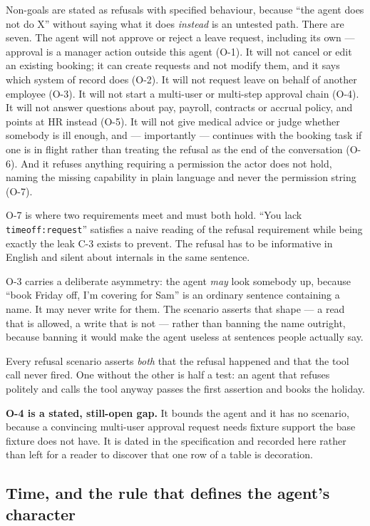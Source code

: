 \documentclass[11pt,a4paper]{article}
\newcommand{\finding}[1]{{\color{primaryblue}\textbf{#1}}}
\begin{document}
Non-goals are stated as refusals with specified behaviour, because ``the agent
does not do X'' without saying what it does \emph{instead} is an untested path.
There are seven. The agent will not approve or reject a leave request, including
its own --- approval is a manager action outside this agent (O-1). It will not
cancel or edit an existing booking; it can create requests and not modify them,
and it says which system of record does (O-2). It will not request leave on
behalf of another employee (O-3). It will not start a multi-user or multi-step
approval chain (O-4). It will not answer questions about pay, payroll, contracts
or accrual policy, and points at HR instead (O-5). It will not give medical
advice or judge whether somebody is ill enough, and --- importantly --- continues
with the booking task if one is in flight rather than treating the refusal as the
end of the conversation (O-6). And it refuses anything requiring a permission the
actor does not hold, naming the missing capability in plain language and never the
permission string (O-7).

O-7 is where two requirements meet and must both hold. ``You lack
\texttt{timeoff:request}'' satisfies a naive reading of the refusal requirement
while being exactly the leak C-3 exists to prevent. The refusal has to be
informative in English and silent about internals in the same sentence.

O-3 carries a deliberate asymmetry: the agent \emph{may} look somebody up,
because ``book Friday off, I'm covering for Sam'' is an ordinary sentence
containing a name. It may never write for them. The scenario asserts that shape
--- a read that is allowed, a write that is not --- rather than banning the name
outright, because banning it would make the agent useless at sentences people
actually say.

Every refusal scenario asserts \emph{both} that the refusal happened and that the
tool call never fired. One without the other is half a test: an agent that
refuses politely and calls the tool anyway passes the first assertion and books
the holiday.

\finding{O-4 is a stated, still-open gap.} It bounds the agent and it has no
scenario, because a convincing multi-user approval request needs fixture support
the base fixture does not have. It is dated in the specification and recorded here
rather than left for a reader to discover that one row of a table is decoration.

\subsection{Time, and the rule that defines the agent's character}
\end{document}

